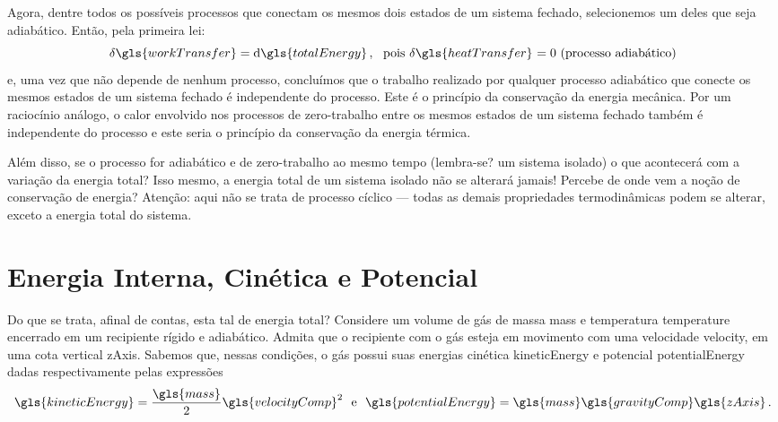     Agora, dentre todos os possíveis processos que conectam os mesmos dois
    estados de um sistema fechado, selecionemos um deles que seja adiabático.
    Então, pela primeira lei:
    \begin{equation} \label{eq:2.5}
        \idiff{\gls{workTransfer}}
        =
        \diff{\gls{totalEnergy}}\,,
        \,\,\,\,
        \text{pois \idiff{\gls{heatTransfer}} $= 0$ (processo adiabático)}
    \end{equation}
    e, uma vez que  não depende de nenhum processo,
    concluímos que o trabalho realizado por qualquer processo adiabático que
    conecte os mesmos estados de um sistema fechado é independente do processo.
    Este é o princípio da conservação da energia mecânica. Por um raciocínio
    análogo, o calor envolvido nos processos de zero-trabalho entre os mesmos
    estados de um sistema fechado também é independente do processo e este
    seria o princípio da conservação da energia térmica.

    Além disso, se o processo for adiabático e de zero-trabalho ao mesmo tempo
    (lembra-se? um sistema isolado) o que acontecerá com a variação da energia
    total? Isso mesmo, a energia total de um sistema isolado não se alterará
    jamais! Percebe de onde vem a noção de conservação de energia? Atenção:
    aqui não se trata de processo cíclico --- todas as demais propriedades
    termodinâmicas podem se alterar, exceto a energia total do sistema.


    \section{Energia Interna, Cinética e Potencial}

    Do que se trata, afinal de contas, esta tal de energia total? Considere um
    volume de gás de massa \gls{mass} e temperatura \gls{temperature} encerrado
    em um recipiente rígido e adiabático.  Admita que o recipiente com o gás
    esteja em movimento com uma velocidade \gls{velocity}, em uma cota vertical
    \gls{zAxis}. Sabemos que, nessas condições, o gás possui suas energias
    cinética \gls{kineticEnergy} e potencial \gls{potentialEnergy}  dadas
    respectivamente pelas expressões
    \begin{equation} \label{eq:2.6}
        \gls{kineticEnergy}
        =
        \frac{\gls{mass}}{2}
        \gls{velocityComp}^2
        \,\,\,\,
        \text{e}
        \,\,\,\,
        \gls{potentialEnergy}
        =
        \gls{mass}
        \gls{gravityComp}
        \gls{zAxis}\,.
    \end{equation}

